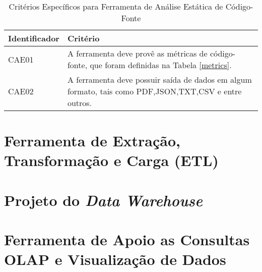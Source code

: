 	\begin{table}[!ht]
	\begin{center}
	 \begin{tabular}{|l|p{10cm}|}
		\hline
		Identificador & Critério 
		\\ \hline
		CAE01 & A ferramenta deve provê as métricas de código-fonte, que foram definidas na Tabela \ref{metrics}.
		\\ \hline
		CAE02 & A ferramenta deve possuir saída de dados em algum formato, tais como PDF,JSON,TXT,CSV e entre outros.      
		\\ \hline
		\end{tabular}
		\caption{Critérios Específicos para Ferramenta de Análise Estática de Código-Fonte}
		\label{specific}
		\end{center}
		\end{table}	


\section{Ferramenta de Extração, Transformação e Carga (ETL)}

\section{Projeto do \textit{Data Warehouse}}

\section{Ferramenta de Apoio as Consultas OLAP e Visualização de Dados}




